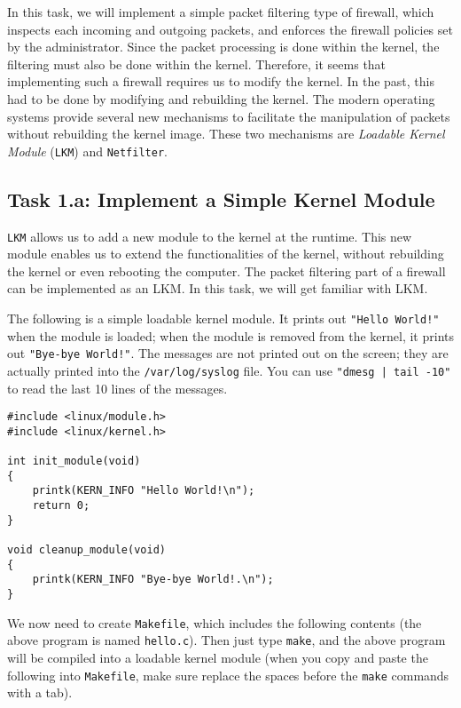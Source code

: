 In this task, we will implement a simple packet filtering 
type of firewall, which 
inspects each incoming and outgoing packets, and enforces the firewall policies 
set by the administrator. Since the packet 
processing is done within the kernel, the filtering must also be 
done within the kernel. Therefore, it seems that implementing such
a firewall requires us to modify the \linux kernel. In the past, 
this had to be done by modifying and rebuilding 
the kernel. The modern \linux 
operating systems provide several new mechanisms 
to facilitate the manipulation of packets without rebuilding
the kernel image. These two mechanisms are 
\textit{Loadable Kernel Module} (\texttt{LKM}) and \texttt{Netfilter}.



\subsection{Task 1.a: Implement a Simple Kernel Module}


{\tt LKM} allows us to add a new module to the kernel at the runtime. 
This new module enables us to extend the functionalities of the kernel,
without rebuilding the kernel or even rebooting the computer. 
The packet filtering part of a firewall can be implemented as an LKM. 
In this task, we will get familiar with LKM.


The following is a simple loadable kernel module. It prints out 
\texttt{"Hello World!"} when the module is loaded; when the module
is removed from the kernel, it prints out \texttt{"Bye-bye World!"}.
The messages are not printed out on the screen; they are 
actually printed into the \texttt{/var/log/syslog} file. You can
use \texttt{"dmesg | tail -10"} to read the last 10 lines of 
the messages. 


\begin{lstlisting}
#include <linux/module.h>
#include <linux/kernel.h>

int init_module(void)
{
    printk(KERN_INFO "Hello World!\n");
    return 0;
}

void cleanup_module(void)
{
    printk(KERN_INFO "Bye-bye World!.\n");
}
\end{lstlisting}

We now need to create {\tt Makefile}, which includes the following
contents (the above program is named {\tt hello.c}). Then 
just type {\tt make}, and the above program will be compiled
into a loadable kernel module (when you copy and paste the following
into \texttt{Makefile}, make sure replace the spaces before the 
\texttt{make} commands with a tab).


